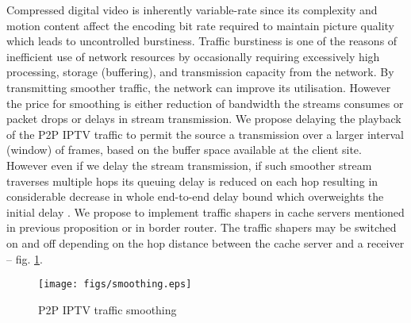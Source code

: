 \documentclass[10pt, conference, compsocconf]{IEEEtran}
\begin{document}
Compressed digital video is inherently variable-rate since its complexity and motion content affect the encoding bit rate required to maintain picture quality which leads to uncontrolled burstiness. Traffic burstiness is one of the reasons of inefficient use of network resources by occasionally requiring excessively high processing, storage (buffering), and transmission capacity from the network. By transmitting smoother traffic, the network can improve its utilisation. However the price for smoothing is either reduction of bandwidth the streams consumes or packet drops or delays in stream transmission. We propose delaying the playback of the P2P IPTV traffic to permit the source a transmission over a larger interval (window) of frames, based on the buffer space available at the client site. However even if we delay the stream transmission, if such smoother stream traverses multiple hops its queuing delay is reduced on each hop resulting in considerable decrease in whole end-to-end delay bound which overweights the initial delay \cite{paola_improving_1996}⁠. We propose to implement traffic shapers in cache servers mentioned in previous proposition or in border router. The traffic shapers may be switched on and off depending on the hop distance between the cache server and a receiver -- fig. \ref{fig:smoothing}.
\begin{figure}[!t]
\centering
\texttt{[image: figs/smoothing.eps]}
\caption{P2P IPTV traffic smoothing}
\label{fig:smoothing}
\end{figure}
\end{document}

